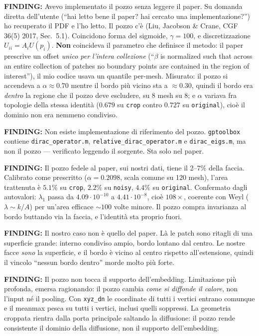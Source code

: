 \documentclass[11pt,a4paper]{article}
\newcommand{\finding}[1]{\textcolor{finding}{\textbf{FINDING:}} #1}
\begin{document}
\finding{Avevo implementato il pozzo senza leggere il paper.} Su domanda diretta dell'utente
(``hai letto bene il paper? hai cercato una implementazione?'') ho recuperato il PDF e l'ho
letto. Il pozzo c'è (Liu, Jacobson \& Crane, CGF 36(5) 2017, Sec.~5.1). Coincidono forma del
sigmoide, $\gamma = 100$, e discretizzazione $U_{ii} = A_i U(p_i)$. \textbf{Non} coincideva il
parametro che definisce il metodo: il paper prescrive un offset \emph{unico per l'intera
collezione} (``$\beta$ is normalized such that across an entire collection of patches no
boundary points are contained in the region of interest''), il mio codice usava un quantile
per-mesh. Misurato: il pozzo si accendeva a $\alpha \approx 0.70$ mentre il bordo più vicino
sta a $\approx 0.30$, quindi il bordo era \emph{dentro} la regione che il pozzo deve escludere,
su 8 mesh su 8; e $\alpha$ variava fra topologie della stessa identità ($0.679$ su
\texttt{crop} contro $0.727$ su \texttt{original}), cioè il dominio non era nemmeno condiviso.

\finding{Non esiste implementazione di riferimento del pozzo.} \texttt{gptoolbox} contiene
\texttt{dirac\_operator.m}, \texttt{relative\_dirac\_operator.m} e \texttt{dirac\_eigs.m}, ma
non il pozzo --- verificato leggendo il sorgente. Sta solo nel paper.

\finding{Il pozzo fedele al paper, sui nostri dati, tiene il 2--7\% della faccia.} Calibrato
come prescritto ($\alpha = 0.2098$, scala comune su 120 mesh), l'area trattenuta è $5.1\%$ su
\texttt{crop}, $2.2\%$ su \texttt{noisy}, $4.4\%$ su \texttt{original}. Confermato dagli
autovalori: $\lambda_1$ passa da $4.09\cdot10^{-10}$ a $4.41\cdot10^{-8}$, cioè $108\times$,
coerente con Weyl ($\lambda \sim k/A$) per un'area efficace $\sim100$ volte minore. Il pozzo
compra invarianza al bordo buttando via la faccia, e l'identità sta proprio fuori.

\finding{Il nostro caso non è quello del paper.} Là le patch sono ritagli di una superficie
grande: interno condiviso ampio, bordo lontano dal centro. Le nostre facce \emph{sono} la
superficie, e il bordo è vicino al centro rispetto all'estensione, quindi il vincolo
``nessun bordo dentro'' morde molto più forte.

\finding{Il pozzo non tocca il supporto dell'embedding.} Limitazione più profonda, emersa
ragionando: il pozzo cambia \emph{come si diffonde il calore}, non l'input né il pooling. Con
\texttt{xyz\_dn} le coordinate di tutti i vertici entrano comunque e il meanmax pesca su tutti
i vertici, inclusi quelli soppressi. La geometria croppata rientra dalla porta principale
saltando la diffusione: il pozzo rende consistente il dominio della diffusione, non il
supporto dell'embedding.
\end{document}
